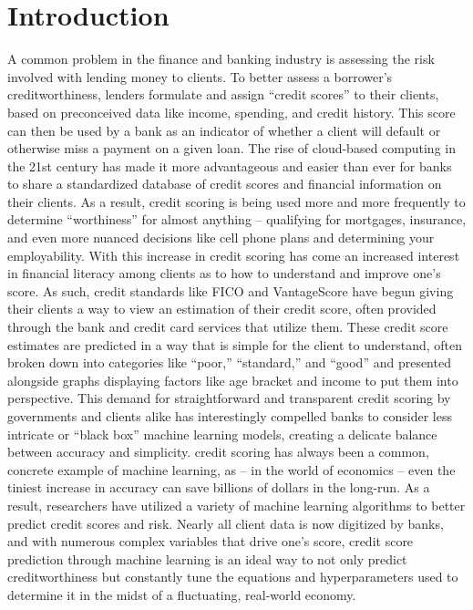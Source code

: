 \documentclass[conference, 11pt]{IEEEtran}
\begin{document}
\section{Introduction}
A common problem in the finance and banking industry is assessing the risk involved with lending money to clients.
To better assess a borrower's creditworthiness, lenders formulate and assign “credit scores” to their clients, based on preconceived data 
like income, spending, and credit history.
This score can then be used by a bank as an indicator of whether a client will default or otherwise miss a payment on a given loan.
The rise of cloud-based computing in the 21st century has made it more advantageous and easier than ever for banks to share a
standardized database of credit scores and financial information on their clients.
As a result, credit scoring is being used more and more frequently to determine “worthiness” for almost anything -- qualifying for
mortgages, insurance, and even more nuanced decisions like cell phone plans and determining your employability.
\vspace{5mm}\newline
With this increase in credit scoring has come an increased interest in financial literacy among clients as to how to understand and improve
one's score.
As such, credit standards like FICO and VantageScore have begun giving their clients a way to view an estimation of their credit score, often
provided through the bank and credit card services that utilize them.
These credit score estimates are predicted in a way that is simple for the client to understand, often broken down into categories like
“poor,” “standard,” and “good” and presented alongside graphs displaying factors like age bracket and income to put them into perspective.
This demand for straightforward and transparent credit scoring by governments and clients alike has interestingly compelled banks to
consider less intricate or “black box” machine learning models, creating a delicate balance between accuracy and simplicity.
\vspace{5mm}\newline
credit scoring has always been a common, concrete example of machine learning, as -- in the world of economics -- even the tiniest increase
in accuracy can save billions of dollars in the long-run.
As a result, researchers have utilized a variety of machine learning algorithms to better predict credit scores and risk.
Nearly all client data is now digitized by banks, and with numerous complex variables that drive one's score, credit score prediction
through machine learning is an ideal way to not only predict creditworthiness but constantly tune the equations and hyperparameters used
to determine it in the midst of a fluctuating, real-world economy.
\end{document}
